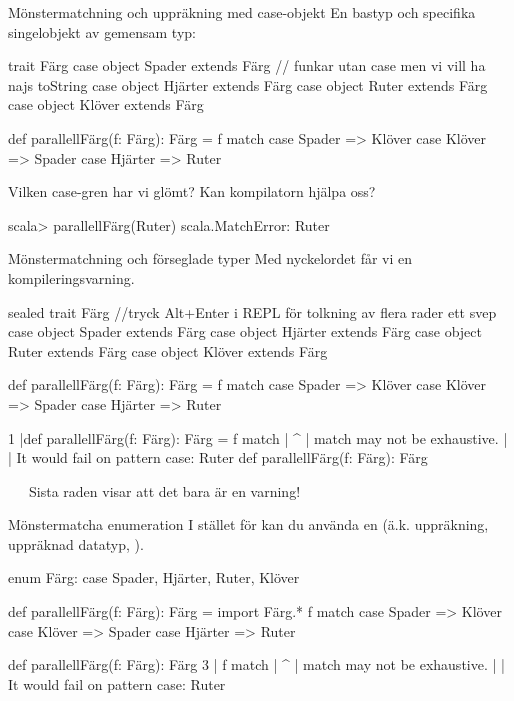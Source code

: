 \begin{Slide}{Mönstermatchning och uppräkning med case-objekt}\SlideFontSmall
En bastyp och specifika singelobjekt av gemensam typ:
\begin{Code}
trait Färg
case object Spader  extends Färg // funkar utan case men vi vill ha najs toString
case object Hjärter extends Färg
case object Ruter   extends Färg
case object Klöver  extends Färg

def parallellFärg(f: Färg): Färg = f match
  case Spader  => Klöver
  case Klöver  => Spader
  case Hjärter => Ruter
\end{Code}
Vilken case-gren har vi glömt? Kan kompilatorn hjälpa oss?
\pause
\begin{REPL}
scala> parallellFärg(Ruter)
scala.MatchError: Ruter 
\end{REPL}
 \code{:(}
\end{Slide}

\begin{Slide}{Mönstermatchning och förseglade typer}\SlideFontSmall
Med nyckelordet  får vi en kompileringsvarning.
\begin{Code}
sealed trait Färg //tryck Alt+Enter i REPL för tolkning av flera rader ett svep
case object Spader  extends Färg
case object Hjärter extends Färg
case object Ruter   extends Färg
case object Klöver  extends Färg

def parallellFärg(f: Färg): Färg = f match 
  case Spader  => Klöver
  case Klöver  => Spader
  case Hjärter => Ruter
\end{Code}
\begin{REPL}
1 |def parallellFärg(f: Färg): Färg = f match 
  |                                   ^
  |                           match may not be exhaustive.
  |
  |                           It would fail on pattern case: Ruter
def parallellFärg(f: Färg): Färg
\end{REPL}
 \code{:)} ~~~Sista raden visar att det bara är en varning!
\end{Slide}

\begin{Slide}{Mönstermatcha enumeration}\SlideFontSmall
I stället för  kan du använda en  (ä.k. uppräkning, uppräknad datatyp, ).
\begin{Code}
enum Färg:
  case Spader, Hjärter, Ruter, Klöver
  
def parallellFärg(f: Färg): Färg = 
  import Färg.*
  f match 
    case Spader  => Klöver
    case Klöver  => Spader
    case Hjärter => Ruter
\end{Code}
\pause
\begin{REPL}
def parallellFärg(f: Färg): Färg
3 |  f match 
  |  ^
  |  match may not be exhaustive.
  |
  |  It would fail on pattern case: Ruter
\end{REPL}
 \code{:)} 
\end{Slide}

